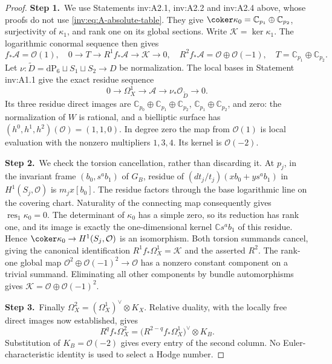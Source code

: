 \begin{proof}
\par\smallskip\noindent\textbf{Step 1.}\ We use Statements inv:A2.1, inv:A2.2 and inv:A2.4 above, whose proofs do not use
\eqref{inv:eq:A-absolute-table}.  They give
$\coker\kappa_0=\mathbb C_{p_1}\oplus\mathbb C_{p_2}$,
surjectivity of $\kappa_1$, and rank one on its global sections.
Write $\mathcal K=\ker\kappa_1$.  The logarithmic conormal sequence
then gives
\[
f_*\mathcal A=\mathcal O(1),\quad
0\to T\to R^1f_*\mathcal A\to\mathcal K\to0,\quad
R^2f_*\mathcal A=\mathcal O\oplus\mathcal O(-1),
\quad T=\mathbb C_{p_1}\oplus\mathbb C_{p_2}.
\]
Let $\nu:\widetilde D=\mathrm{dP}_6\sqcup S_1\sqcup S_2\to D$
be normalization.  The local bases in Statement inv:A1.1 give the exact
residue sequence
\[
0\to\Omega_X^1\to\mathcal A\to\nu_*\mathcal O_{\widetilde D}\to0.
\]
Its three residue direct images are
$\mathbb C_{p_0}\oplus\mathbb C_{p_1}\oplus\mathbb C_{p_2}$,
$\mathbb C_{p_1}\oplus\mathbb C_{p_2}$, and zero: the normalization of $W$ is
rational, and a bielliptic surface has $(h^0,h^1,h^2)(\mathcal O)=(1,1,0)$.
In degree zero the map from $\mathcal O(1)$ is local evaluation with the
nonzero multipliers $1,3,4$.  Its kernel is $\mathcal O(-2)$.

\par\smallskip\noindent\textbf{Step 2.}\ We check the torsion cancellation, rather than discarding it.  At
$p_j$, in the invariant frame $(b_0,s^ab_1)$ of $G_B$, residue of
$(dt_j/t_j)(x b_0+y s^ab_1)$ in $H^1(S_j,\mathcal O)$ is $m_jx[b_0]$.
The residue factors through the base logarithmic line on the covering
chart.  Naturality of the connecting map consequently gives
$\operatorname{res}_1\kappa_0=0$.  The determinant of $\kappa_0$
has a simple zero, so its reduction has rank one, and its image is
exactly the one-dimensional kernel $\mathbb C s^ab_1$ of this residue.
Hence $\coker\kappa_0\to H^1(S_j,\mathcal O)$ is an isomorphism.
Both torsion summands cancel, giving the canonical identification
$R^1f_*\Omega_X^1=\mathcal K$ and the asserted $R^2$.
The rank-one global map
$\mathcal O^2\oplus\mathcal O(-1)^2\to\mathcal O$ has a nonzero constant component
on a trivial summand.  Eliminating all other components by bundle
automorphisms gives
$\mathcal K=\mathcal O\oplus\mathcal O(-1)^2$.

\par\smallskip\noindent\textbf{Step 3.}\ Finally $\Omega_X^2=(\Omega_X^1)^\vee\otimes K_X$.  Relative
duality, with the locally free direct images now established, gives
\[
R^qf_*\Omega_X^2
=\bigl(R^{2-q}f_*\Omega_X^1\bigr)^\vee\otimes K_B.
\]
Substitution of $K_B=\mathcal O(-2)$ gives every entry of the second column.
No Euler-characteristic identity is used to select a Hodge number.
\end{proof}

